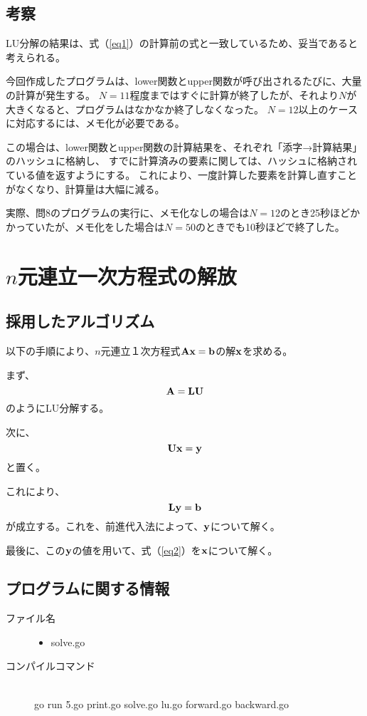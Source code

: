 \documentclass[11pt]{ltjsarticle}
\begin{document}
		\subsection{考察}
			LU分解の結果は、式（\ref{eq1}）の計算前の式と一致しているため、妥当であると考えられる。
			
			今回作成したプログラムは、lower関数とupper関数が呼び出されるたびに、大量の計算が発生する。
			$N=11$程度まではすぐに計算が終了したが、それより$N$が大きくなると、プログラムはなかなか終了しなくなった。
			$N=12$以上のケースに対応するには、メモ化が必要である。
			
			この場合は、lower関数とupper関数の計算結果を、それぞれ「添字→計算結果」のハッシュに格納し、
			すでに計算済みの要素に関しては、ハッシュに格納されている値を返すようにする。
			これにより、一度計算した要素を計算し直すことがなくなり、計算量は大幅に減る。
			
			実際、問8のプログラムの実行に、メモ化なしの場合は$N=12$のとき25秒ほどかかっていたが、メモ化をした場合は$N=50$のときでも10秒ほどで終了した。

    \section{$n$元連立一次方程式の解放}
    	\subsection{採用したアルゴリズム}
			以下の手順により、$n$元連立１次方程式${\bf Ax} = {\bf b}$の解${\bf x}$を求める。
			
			まず、
			\[
				{\bf A} = {\bf LU}
			\]
			のようにLU分解する。
			
			次に、
			\begin{equation}
				{\bf Ux} = {\bf y} \label{eq2}
			\end{equation}
			と置く。
			
			これにより、
			\[
				{\bf Ly} = {\bf b}
			\]
			が成立する。これを、前進代入法によって、${\bf y}$について解く。
			
			最後に、この${\bf y}$の値を用いて、式（\ref{eq2}）を${\bf x}$について解く。

		\subsection{プログラムに関する情報}
			\begin{description}
	        	\item[ファイル名]\mbox{}
					\begin{itemize}
						\item solve.go
					\end{itemize}
				\item[コンパイルコマンド]\mbox{}\\
					go run 5.go print.go solve.go lu.go forward.go backward.go
			\end{description}
\end{document}
